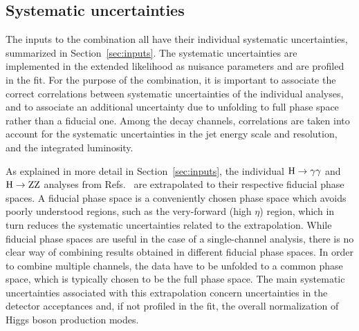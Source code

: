 \subsection{Systematic uncertainties}
\label{sec:systematics}


The inputs to the combination all have their individual systematic uncertainties, summarized in Section~\ref{sec:inputs}.
% 
The systematic uncertainties are implemented in the extended likelihood as nuisance parameters and are profiled in the fit.
% 
For the purpose of the combination, it is important to associate the correct correlations between systematic uncertainties of the individual analyses, and to associate an additional uncertainty due to unfolding to full phase space rather than a fiducial one.
% 
Among the decay channels, correlations are taken into account for the systematic uncertainties in the jet energy scale and resolution, and the integrated luminosity.


As explained in more detail in Section~\ref{sec:inputs}, the individual $\mathrm{H}\to\mathrm{\gamma}\mathrm{\gamma}$ and $\mathrm{H}\to\mathrm{Z}\mathrm{Z}$ analyses from Refs.~\cite{Sirunyan:2018kta,Sirunyan:2017exp} are extrapolated to their respective fiducial phase spaces.
% 
A fiducial phase space is a conveniently chosen phase space which avoids poorly understood regions, such as the very-forward (high $\eta$) region, which in turn reduces the systematic uncertainties related to the extrapolation.
% 
While fiducial phase spaces are useful in the case of a single-channel analysis, there is no clear way of combining results obtained in different fiducial phase spaces.
% 
In order to combine multiple channels, the data have to be unfolded to a common phase space, which is typically chosen to be the full phase space.
% 
The main systematic uncertainties associated with this extrapolation concern uncertainties in the detector acceptances and, if not profiled in the fit, the overall normalization of Higgs boson production modes.



